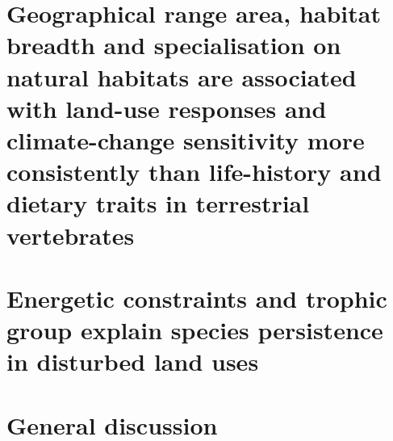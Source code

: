 \documentclass[11pt]{report}
\renewcommand{\baselinestretch}{1.5}
\begin{document}
\begin{refsection}
\chapter{Geographical range area, habitat breadth and specialisation on natural habitats are associated with land-use responses and climate-change sensitivity more consistently than life-history and dietary traits in terrestrial vertebrates}
\label{sec:4}


\chapter{Energetic constraints and trophic group explain species persistence in disturbed land uses}
\label{sec:5}


\chapter{General discussion}
\label{sec:6}





\clearpage
{}
{}
\renewcommand{\baselinestretch}{1}
\printbibliography[title={Bibliography}]
\clearpage

\end{refsection}
\end{document}
